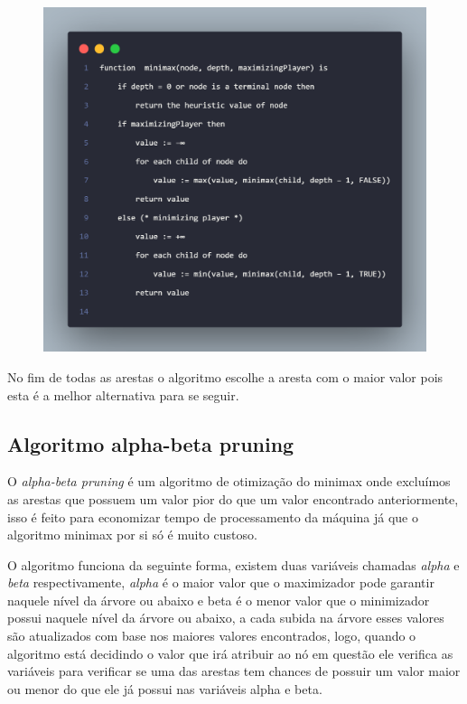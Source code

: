 \begin{figure}[!htb]
    \centering
    \label{minimax-code}
    \includegraphics[scale=0.25]{figuras/minimax.png}
\end{figure}

No fim de todas as arestas o algoritmo escolhe a aresta com o maior valor pois esta é a melhor alternativa para se seguir.

\subsection{Algoritmo alpha-beta pruning}

O \textit{alpha-beta pruning} é um algoritmo de otimização do minimax onde excluímos as arestas que possuem um valor
pior do que um valor encontrado anteriormente, isso é feito para economizar tempo de processamento da máquina
já que o algoritmo minimax por si só é muito custoso.

O algoritmo funciona da seguinte forma, existem duas variáveis chamadas \textit{alpha} e \textit{beta} respectivamente,
\textit{alpha} é o maior valor que o maximizador pode garantir naquele nível da árvore ou abaixo e beta é o menor
valor que o minimizador possui naquele nível da árvore ou abaixo, a cada subida na árvore esses valores são
atualizados com base nos maiores valores encontrados, logo, quando o algoritmo está decidindo o valor que irá
atribuir ao nó em questão ele verifica as variáveis para verificar se uma das arestas tem chances de possuir
um valor maior ou menor do que ele já possui nas variáveis alpha e beta.

